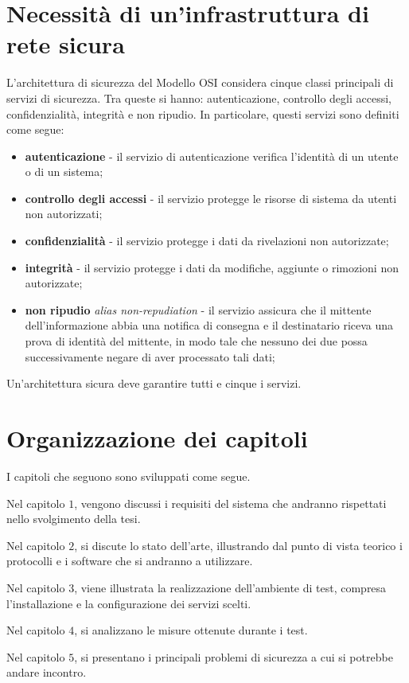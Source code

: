 \section{Necessità di un'infrastruttura di rete sicura}
L'architettura di sicurezza del Modello OSI considera cinque classi principali di servizi di sicurezza. Tra queste si hanno: autenticazione, controllo degli accessi, confidenzialità, integrità e non ripudio.
In particolare, questi servizi sono definiti come segue:
\begin{itemize}
    \item \textbf{autenticazione} - il servizio di autenticazione verifica l'identità di un utente o di un sistema;
    \item \textbf{controllo degli accessi} - il servizio protegge le risorse di sistema da utenti non autorizzati;
    \item \textbf{confidenzialità} - il servizio protegge i dati da rivelazioni non autorizzate;
    \item \textbf{integrità} - il servizio protegge i dati da modifiche, aggiunte o rimozioni non autorizzate;
    \item \textbf{non ripudio} \emph{alias non-repudiation} - il servizio assicura che il mittente dell'informazione abbia una notifica di consegna e il destinatario riceva una prova di identità del mittente, in modo tale che nessuno dei due possa successivamente negare di aver processato tali dati;
\end{itemize}
Un'architettura sicura deve garantire tutti e cinque i servizi.

\section{Organizzazione dei capitoli}
I capitoli che seguono sono sviluppati come segue.

Nel capitolo $1$, vengono discussi i requisiti del sistema che andranno rispettati nello svolgimento della tesi.

Nel capitolo $2$, si discute lo stato dell'arte, illustrando dal punto di vista teorico i protocolli e i software che si andranno a utilizzare.

Nel capitolo $3$, viene illustrata la realizzazione dell'ambiente di test, compresa l'installazione e la configurazione dei servizi scelti.

Nel capitolo $4$, si analizzano le misure ottenute durante i test.

Nel capitolo $5$, si presentano i principali problemi di sicurezza a cui si potrebbe andare incontro.

